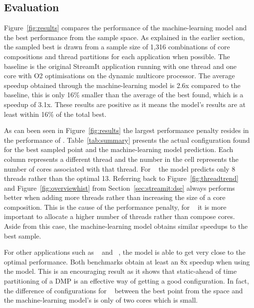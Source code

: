 \subsection{Evaluation}

Figure~\ref{fig:results} compares the performance of the machine-learning model and the best performance from the sample space.
As explained in the earlier section, the sampled best is drawn from a sample size of 1,316 combinations of core compositions and thread partitions for each application when possible.
The baseline is the original StreamIt application running with one thread and one core with O2 optimisations on the dynamic multicore processor.
The average speedup obtained through the machine-learning model is 2.6x compared to the baseline, this is only 16\% smaller than the average of the best found, which is a speedup of 3.1x.
These results are positive as it means the model's results are at least within 16\% of the total best.

As can been seen in Figure~\ref{fig:results} the largest performance penalty resides in the performance of .
Table~\ref{tab:summary} presents the actual configuration found for the best sampled point and the machine-learning model prediction.
Each column represents a different thread and the number in the cell represents the number of cores associated with that thread.
For ~ the model predicts only 8 threads rather than the optimal 13.
Referring back to Figure~\ref{fig:threadtrend} and Figure~\ref{fig:overviewhist} from Section~\ref{sec:streamit:dse}  always performs better when adding more threads rather than increasing the size of a core composition.
This is the cause of the performance penalty, for ~ it is more important to allocate a higher number of threads rather than compose cores.
Aside from this case, the machine-learning model obtains similar speedups to the best sample.

For other applications such as ~ and ~, the model is able to get very close to the optimal performance.
Both benchmarks obtain at least an 8x speedup when using the model.
This is an encouraging result as it shows that static-ahead of time partitioning of a DMP is an effective way of getting a good configuration.
In fact, the difference of configurations for ~ between the best point from the space and the machine-learning model's is only of two cores which is small.

